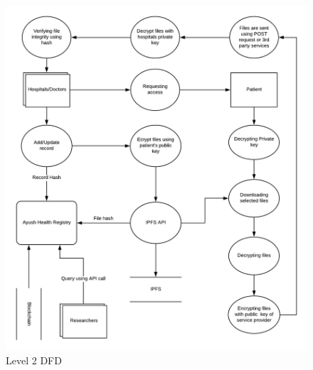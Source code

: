 \documentclass[11pt]{report}
\begin{document}
    \begin{figure}[h!]
        \centering
        \includegraphics[scale=0.9]{DFD2.png}
        \caption{Level 2 DFD}
        \label{fig:my_label}
    \end{figure}
        
\end{document}
